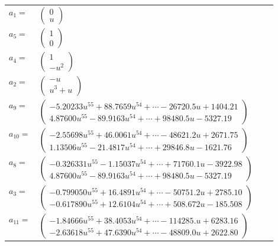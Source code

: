 \documentclass[1p]{elsarticle_modified}
\theoremstyle{definition}
\begin{document}
\begin{tabular}{m{7pt} m{180pt} m{7pt} m{180pt} }
\flushright $a_{1}=$&$\begin{pmatrix}0\\u\end{pmatrix}$ \\
\flushright $a_{5}=$&$\begin{pmatrix}1\\0\end{pmatrix}$ \\
\flushright $a_{4}=$&$\begin{pmatrix}1\\- u^2\end{pmatrix}$ \\
\flushright $a_{2}=$&$\begin{pmatrix}- u\\u^3+u\end{pmatrix}$ \\
\flushright $a_{9}=$&$\begin{pmatrix}-5.20233 u^{55}+88.7659 u^{54}+\cdots-26720.5 u+1404.21\\4.87600 u^{55}-89.9163 u^{54}+\cdots+98480.5 u-5327.19\end{pmatrix}$ \\
\flushright $a_{10}=$&$\begin{pmatrix}-2.55698 u^{55}+46.0061 u^{54}+\cdots-48621.2 u+2671.75\\1.13506 u^{55}-21.4817 u^{54}+\cdots+29846.8 u-1621.76\end{pmatrix}$ \\
\flushright $a_{8}=$&$\begin{pmatrix}-0.326331 u^{55}-1.15037 u^{54}+\cdots+71760.1 u-3922.98\\4.87600 u^{55}-89.9163 u^{54}+\cdots+98480.5 u-5327.19\end{pmatrix}$ \\
\flushright $a_{3}=$&$\begin{pmatrix}-0.799050 u^{55}+16.4891 u^{54}+\cdots-50751.2 u+2785.10\\-0.617890 u^{55}+12.6104 u^{54}+\cdots+508.672 u-185.508\end{pmatrix}$ \\
\flushright $a_{11}=$&$\begin{pmatrix}-1.84666 u^{55}+38.4053 u^{54}+\cdots-114285. u+6283.16\\-2.63618 u^{55}+47.6390 u^{54}+\cdots-48809.0 u+2622.80\end{pmatrix}$ \\

\end{tabular}
\end{document}
